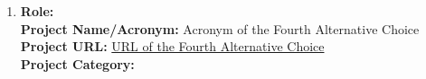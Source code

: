 \documentclass[runningheads]{llncs}
\begin{document}
\begin{description}
\begin{enumerate}
       \item \textbf{Role:} %
\\
                \textbf{Project Name/Acronym:} Acronym of the Fourth Alternative Choice %
\\
                \textbf{Project URL:} \url{URL of the Fourth Alternative Choice} %
\\
                \textbf{Project Category:} %
    \end{enumerate}
\end{description}
%
\end{document}
